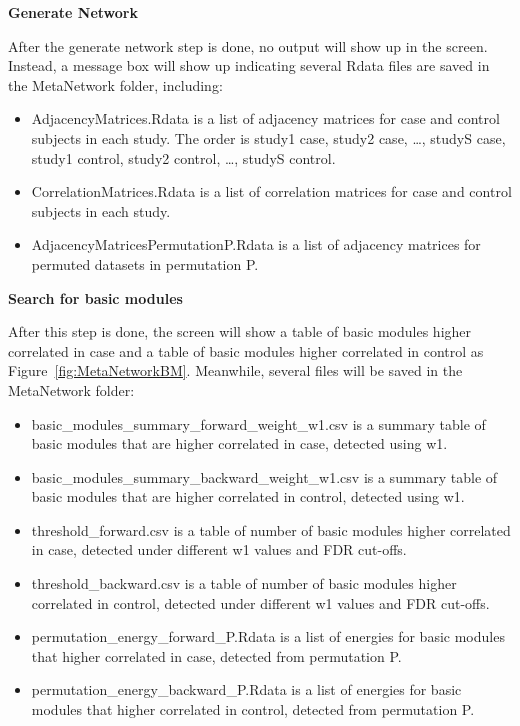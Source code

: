 \textbf{Generate Network}

After the generate network step is done, no output will show up in the screen. Instead, a message box will show up indicating several Rdata files are saved in the MetaNetwork folder, including:

\begin{itemize}
\item AdjacencyMatrices.Rdata is a list of adjacency matrices for case and control subjects in each study. The order is study1 case, study2 case, \dots, studyS case, study1 control, study2 control, \dots, studyS control.
\item CorrelationMatrices.Rdata is a list of correlation matrices for case and control subjects in each study.
\item AdjacencyMatricesPermutationP.Rdata is a list of adjacency matrices for permuted datasets in permutation P.
\end{itemize}

\textbf{Search for basic modules}

After this step is done, the screen will show a table of basic modules higher correlated in case and a table of basic modules higher correlated in control as Figure~\ref{fig:MetaNetworkBM}. Meanwhile, several files will be saved in the MetaNetwork folder:

\begin{itemize}
 \item basic\_modules\_summary\_forward\_weight\_w1.csv is a summary table of basic modules that are higher correlated in case, detected using w1.
 \item basic\_modules\_summary\_backward\_weight\_w1.csv is a summary table of basic modules that are higher correlated in control, detected using w1.
\item threshold\_forward.csv is a table of number of basic modules higher correlated in case, detected under different w1 values and FDR cut-offs.
\item threshold\_backward.csv is a table of number of basic modules higher correlated in control, detected under different w1 values and FDR cut-offs.
 \item permutation\_energy\_forward\_P.Rdata is a list of energies for basic modules that higher correlated in case, detected from permutation P.
  \item permutation\_energy\_backward\_P.Rdata is a list of energies for basic modules that higher correlated in control, detected from permutation P.
\end{itemize}


